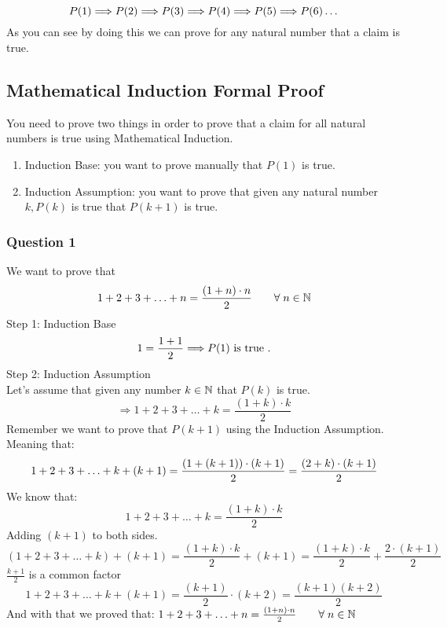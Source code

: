 \[
    P(1) \Longrightarrow P(2) \Longrightarrow P(3) \Longrightarrow P(4) \Longrightarrow P(5) \Longrightarrow P(6) \ldots\\
\]
As you can see by doing this we can prove for any natural number that a claim is true.\\



\subsection{Mathematical Induction Formal Proof}
You need to prove two things in order to prove that a claim for all natural numbers is true using Mathematical Induction.\\
\begin{enumerate}
    \item Induction Base: you want to prove manually that $P(1)$ is true.
    \item Induction Assumption: you want to prove that given any natural number $k, P(k)$ is true that $P(k+1)$ is true.
\end{enumerate}

\newpage
\subsubsection{Question 1}
We want to prove that 
\[
    1+2+3+\ldots+n = \frac{(1+n)\cdot n}{2} \qquad \forall\; n\in \mathbb{N}\\
\]
Step 1: Induction Base\\
\[
    1 = \frac{1+1}{2} \Longrightarrow P(1) \text{ is true }.\\
\]
Step 2: Induction Assumption\\
Let's assume that given any number $k \in \mathbb{N}$ that $P(k)$ is true.\\
\[
    \Longrightarrow 1+2+3+\ldots+k = \frac{(1+k)\cdot k}{2}
\]
Remember we want to prove that $P(k+1)$ using the Induction Assumption.\\
Meaning that:
\[
    1+2+3+\ldots+k+(k+1) = \frac{(1+(k+1))\cdot (k+1)}{2} = \frac{(2+k)\cdot (k+1)}{2}\\
\]
We know that:
\[
    1+2+3+\ldots+k = \frac{(1+k)\cdot k}{2}
\]
Adding $(k+1)$ to both sides.
\[
    (1+2+3+\ldots+k)+(k+1) = \frac{(1+k)\cdot k}{2} + (k+1) = \frac{(1+k)\cdot k}{2} + \frac{2\cdot (k+1)}{2}
\]
$\frac{k+1}{2}$ is a common factor
\[
    1+2+3+\ldots+k+(k+1) = \frac{(k+1)}{2}\cdot (k+2) = \frac{(k+1)(k+2)}{2}
\]
And with that we proved that: $1+2+3+\ldots+n = \frac{(1+n)\cdot n}{2} \qquad \forall\; n \in\mathbb{N}$\\

